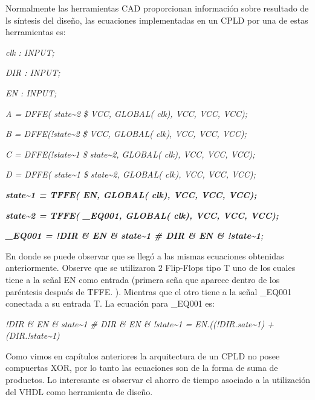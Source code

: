 {
Normalmente las herramientas CAD proporcionan información sobre
resultado de ls síntesis del diseño, las ecuaciones implementadas en un
CPLD por una de estas herramientas es:}

{\itshape
clk  : INPUT;}

{\itshape
DIR  : INPUT;}

{\itshape
EN  : INPUT;}

{\itshape
A  = DFFE( state\~{}2 \$  VCC,  GLOBAL( clk),  VCC,  VCC,  VCC);}

{\itshape
B  = DFFE(!state\~{}2 \$  VCC,  GLOBAL( clk),  VCC,  VCC,  VCC);}

{\itshape
C  = DFFE(!state\~{}1 \$  state\~{}2, GLOBAL( clk),  VCC,  VCC,  VCC);}

{\itshape
D  = DFFE( state\~{}1 \$  state\~{}2, GLOBAL( clk),  VCC,  VCC,  VCC);}

{\bfseries\itshape
state\~{}1  = TFFE( EN, GLOBAL( clk),  VCC,  VCC,  VCC);}

{\bfseries\itshape
state\~{}2  = TFFE( \_EQ001, GLOBAL( clk),  VCC,  VCC,  VCC);}

{\itshape
\foreignlanguage{english}{\textbf{
}}\foreignlanguage{spanish}{\textbf{\_EQ001 = !DIR \&  EN \& 
state\~{}1  \#  DIR \&  EN \&
!state\~{}1}}\foreignlanguage{spanish}{;}}

{
En donde se puede observar que se llegó a las mismas ecuaciones
obtenidas anteriormente. Observe que se utilizaron 2 Flip-Flops tipo T
uno de los cuales tiene a la señal EN como entrada (primera seña que
aparece dentro de los paréntesis después de TFFE. ). Mientras que el
otro tiene a la señal \_EQ001 conectada a su entrada T. La ecuación
para \_EQ001 es:}

{
 \textit{!DIR \&  EN \&  state\~{}1  \#  DIR \&  EN \& !state\~{}1 =
EN.((!DIR.sate\~{}1) + (DIR.!state\~{}1)}}

{
Como vimos en capítulos anteriores la arquitectura de un CPLD no posee
compuertas XOR, por lo tanto las ecuaciones son de la forma de suma de
productos. Lo interesante es observar el ahorro de tiempo asociado a la
utilización del VHDL como herramienta de diseño.}

